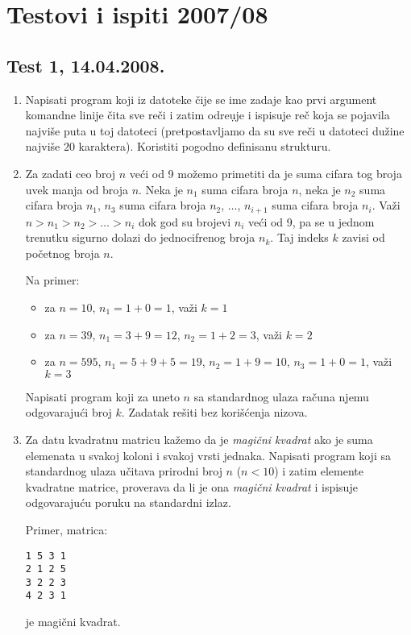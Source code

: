 \chapter{Testovi i ispiti 2007/08}

\section{Test 1, 14.04.2008.}



\begin{enumerate}
\item Napisati program koji iz datoteke \v cije se ime zadaje
kao prvi argument komandne linije \v cita sve re\v ci i zatim
odre\d uje i ispisuje re\v c koja se
pojavila najvi\v se puta u toj datoteci (pretpostavljamo da su sve
re\v ci u datoteci du\v zine najvi\v se $20$ karaktera).
Koristiti pogodno definisanu strukturu.

\item Za zadati ceo broj $n$ ve\'ci od 9 mo\v zemo primetiti da je suma
cifara tog broja uvek manja od broja $n$.
Neka je $n_1$ suma cifara broja $n$,
neka je $n_2$ suma cifara broja $n_1$,
$n_3$ suma cifara broja $n_2$, $\ldots$,
$n_{i+1}$ suma cifara broja $n_{i}$. Va\v{z}i
$n > n_1 > n_2 > \ldots > n_i$ dok god su brojevi
$n_i$ ve\'ci od 9, pa se u jednom trenutku sigurno
dolazi do jednocifrenog broja $n_k$. Taj indeks $k$
zavisi od po\v{c}etnog broja $n$.

Na primer:
\begin{itemize}
\item za $n=10$, $n_1 = 1+0 = 1$, va\v{z}i $k=1$
\item za $n=39$, $n_1 = 3+9 = 12$, $n_2 = 1+2 = 3$, va\v{z}i  $k=2$
\item za $n=595$, $n_1 = 5+9+5 = 19$, $n_2 = 1+9 = 10$, $n_3 = 1+0 = 1$,
va\v{z}i  $k =3$
\end{itemize}

Napisati program koji za uneto $n$ sa standardnog ulaza ra\v cuna
njemu odgovaraju\'ci broj $k$. Zadatak re\v siti bez kori\v s\' cenja nizova.


\item Za datu kvadratnu matricu ka\v zemo da je \emph{magi\v cni
kvadrat} ako je suma elemenata u svakoj koloni i svakoj vrsti
jednaka. Napisati program koji sa standardnog ulaza u\v citava
prirodni broj $n$ ($n<10$) i zatim elemente kvadratne matrice,
proverava da li je ona \emph{magi\v cni kvadrat} i ispisuje
odgovaraju\' cu poruku na standardni izlaz.

Primer, matrica:

\begin{verbatim}
1 5 3 1
2 1 2 5
3 2 2 3
4 2 3 1
\end{verbatim}

je magi\v cni kvadrat.
\end{enumerate}


